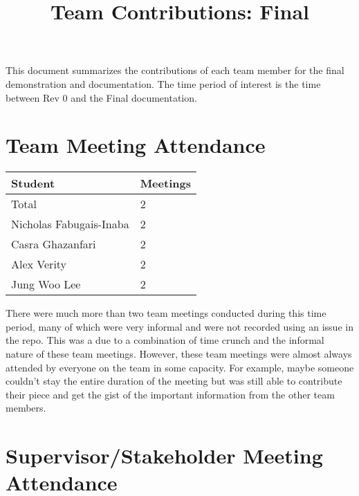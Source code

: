 \documentclass{article}
\title{Team Contributions: Final\\\progname}
\author{\authname}
\date{}
\begin{document}
\maketitle

This document summarizes the contributions of each team member for the final
demonstration and documentation.  The time period of interest is the time
between Rev 0 and the Final documentation.

\section{Team Meeting Attendance}


\begin{table}[H]
\centering
\begin{tabular}{ll}
\toprule
\textbf{Student} & \textbf{Meetings}\\
\midrule
Total & 2\\
Nicholas Fabugais-Inaba & 2\\
Casra Ghazanfari & 2\\
Alex Verity & 2\\
Jung Woo Lee & 2\\
\bottomrule
\end{tabular}
\end{table}

There were much more than two team meetings conducted during this time period, many of 
which were very informal and were not recorded using an issue in the repo. This was 
a due to a combination of time crunch and the informal nature of these team meetings.
However, these team meetings were almost always attended by everyone on the team in
some capacity. For example, maybe someone couldn't stay the entire duration of the 
meeting but was still able to contribute their piece and get the gist of the important
information from the other team members.


\section{Supervisor/Stakeholder Meeting Attendance}
\end{document}
